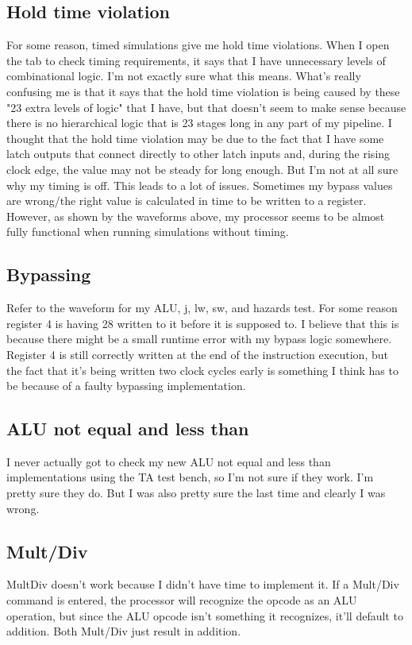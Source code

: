 \documentclass[letterpaper]{article} %
\begin{document}
    \subsection{Hold time violation}
        For some reason, timed simulations give me hold time violations. When I open the tab to check timing requirements, it says that I have unnecessary levels of combinational logic. I'm not exactly sure what this means. What's really confusing me is that it says that the hold time violation is being caused by these "23 extra levels of logic" that I have, but that doesn't seem to make sense because there is no hierarchical logic that is 23 stages long in any part of my pipeline. I thought that the hold time violation may be due to the fact that I have some latch outputs that connect directly to other latch inputs and, during the rising clock edge, the value may not be steady for long enough. But I'm not at all sure why my timing is off. This leads to a lot of issues. Sometimes my bypass values are wrong/the right value is calculated in time to be written to a register. However, as shown by the waveforms above, my processor seems to be almost fully functional when running simulations without timing.
        
    \subsection{Bypassing}
        Refer to the waveform for my ALU, j, lw, sw, and hazards test. For some reason register 4 is having 28 written to it before it is supposed to. I believe that this is because there might be a small runtime error with my bypass logic somewhere. Register 4 is still correctly written at the end of the instruction execution, but the fact that it's being written two clock cycles early is something I think has to be because of a faulty bypassing implementation.
    
    \subsection{ALU not equal and less than}
        I never actually got to check my new ALU not equal and less than implementations using the TA test bench, so I'm not sure if they work. I'm pretty sure they do. But I was also pretty sure the last time and clearly I was wrong.
        
    \subsection{Mult/Div}
        MultDiv doesn't work because I didn't have time to implement it. If a Mult/Div command is entered, the processor will recognize the opcode as an ALU operation, but since the ALU opcode isn't something it recognizes, it'll default to addition. Both Mult/Div just result in addition. 
        
\end{document}
